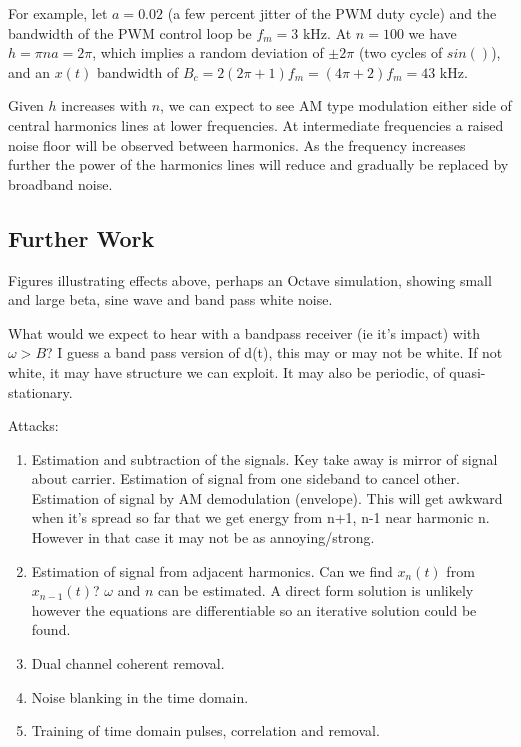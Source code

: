 \documentclass{article}
\begin{document}
For example, let $a=0.02$ (a few percent jitter of the PWM duty cycle) and the bandwidth of the PWM control loop be $f_m=3$ kHz. At $n=100$ we have $h=\pi n a = 2\pi$, which implies a random deviation of $\pm 2\pi$ (two cycles of $sin()$), and an $x(t)$ bandwidth of $B_c=2(2 \pi+1)f_m = (4\pi+2)f_m = 43$ kHz.

Given $h$ increases with $n$, we can expect to see AM type modulation either side of central harmonics lines at lower frequencies.  At intermediate frequencies a raised noise floor will be observed between harmonics.  As the frequency increases further the power of the harmonics lines will reduce and gradually be replaced by broadband noise.

\subsection{Further Work}

Figures illustrating effects above, perhaps an Octave simulation, showing small and large beta, sine wave and band pass white noise.

What would we expect to hear with a bandpass receiver (ie it's impact) with $\omega > B$?  I guess a band pass version of d(t), this may or may not be white.  If not white, it may have structure we can exploit. It may also be periodic, of quasi-stationary.

Attacks:
\begin{enumerate}
\item Estimation and subtraction of the signals. Key take away is mirror of signal about carrier. Estimation of signal from one sideband to cancel other.  Estimation of signal by AM demodulation (envelope). This will get awkward when it's spread so far that we get energy from n+1, n-1 near harmonic n.  However in that case it may not be as annoying/strong.

\item Estimation of signal from adjacent harmonics.  Can we find $x_n(t)$ from $x_{n-1}(t)$?  $\omega$ and $n$ can be estimated.  A direct form solution is unlikely however the equations are differentiable so an iterative solution could be found.

\item Dual channel coherent removal.

\item Noise blanking in the time domain.

\item Training of time domain pulses, correlation and removal.
\end{enumerate}
\end{document}
